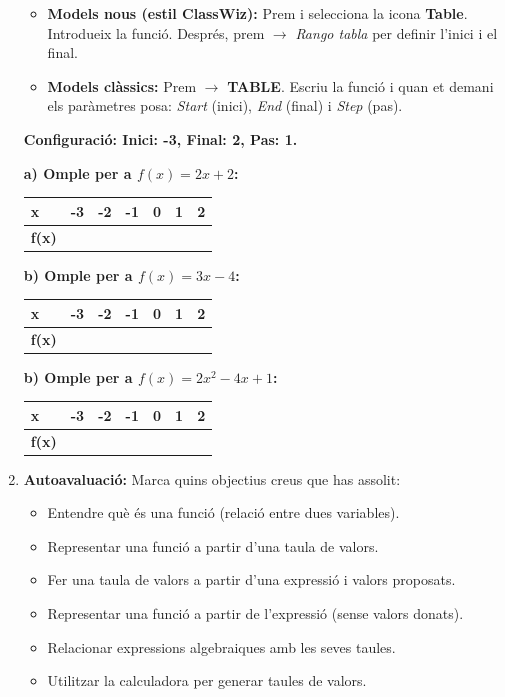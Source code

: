 \documentclass[12pt,a4paper]{article}
\begin{document}
\begin{enumerate}[leftmargin=*, label=\textbf{\arabic*.}]
    \begin{itemize}
        \item \textbf{Models nous (estil ClassWiz):} Prem  i selecciona la icona \textbf{Table}. Introdueix la funció. Després, prem  $\to$ \textit{Rango tabla} per definir l'inici i el final.
        \item \textbf{Models clàssics:} Prem  $\to$ \textbf{TABLE}. Escriu la funció i quan et demani els paràmetres posa: \textit{Start} (inici), \textit{End} (final) i \textit{Step} (pas).
    \end{itemize}
    
    \textbf{Configuració: Inici: -3, Final: 2, Pas: 1.}

    
    \textbf{a) Omple per a $f(x) = 2x + 2$:}\\
    \begin{tabularx}{\linewidth}{|l|*{6}{X|}}
        \hline \textbf{x} & -3 & -2 & -1 & 0 & 1 & 2 \\ \hline \textbf{f(x)} & & & & & & \\ \hline
    \end{tabularx}
    
    \vspace{0.3cm}
    \textbf{b) Omple per a $f(x) = 3x - 4$:} \\
    \begin{tabularx}{\linewidth}{|l|*{6}{X|}}
        \hline \textbf{x} & -3 & -2 & -1 & 0 & 1 & 2 \\ \hline \textbf{f(x)} & & & & & & \\ \hline
    \end{tabularx}

    \vspace{0.3cm}
    \textbf{b) Omple per a $f(x) = 2x^2 -4x +1$:} \\
    \begin{tabularx}{\linewidth}{|l|*{6}{X|}}
        \hline \textbf{x} & -3 & -2 & -1 & 0 & 1 & 2 \\ \hline \textbf{f(x)} & & & & & & \\ \hline
    \end{tabularx}
    \item \textbf{Autoavaluació:} Marca quins objectius creus que has assolit:
    \begin{itemize}[label=$\square$]
        \item Entendre què és una funció (relació entre dues variables).
        \item Representar una funció a partir d'una taula de valors.
        \item Fer una taula de valors a partir d'una expressió i valors proposats.
        \item Representar una funció a partir de l'expressió (sense valors donats).
        \item Relacionar expressions algebraiques amb les seves taules.
        \item Utilitzar la calculadora per generar taules de valors.
    \end{itemize}

\end{enumerate}
\end{document}
